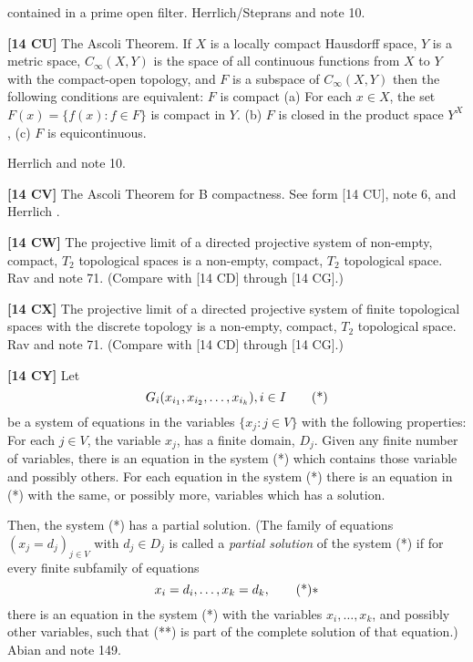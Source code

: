 contained in a prime open filter. \ac{Herrlich/Steprans} \cite{1997}
and note 10.
\smallskip
\item{}{\bf [14 CU]} The Ascoli Theorem. If $X$ is a locally compact
Hausdorff space, $Y$ is a metric space, $C_\infty(X,Y)$ is the space
of all continuous functions from $X$ to $Y$ with the compact-open
topology, and $F$ is a subspace of $C_\infty(X,Y)$ then the following
conditions are equivalent:
 $F$ is compact
 (a) For each $x\in X$, the set $F(x) =\{f(x): f\in F\}$
is compact in $Y$.
\itemitem{}(b) $F$ is closed in the product space $Y^X$,
\itemitem{}(c) $F$ is equicontinuous.
\par \ac{Herrlich} \cite{1997b} and note 10.
\smallskip
\item{}{\bf [14 CV]} The Ascoli Theorem for B compactness. See form
[14 CU], note 6, and \ac{Herrlich} \cite{1997b}.
\smallskip
\item{}{\bf [14 CW]} The projective limit of a directed projective system
of non-empty, compact, $T_2$ topological spaces is a non-empty, compact,
$T_2$ topological space.  \ac{Rav} \cite{1976} and note 71. (Compare
with [14 CD] through [14 CG].)
\smallskip
\item{}{\bf [14 CX]} The projective limit of a directed projective system
of finite topological spaces with the discrete topology is a non-empty,
compact, $T_2$ topological space.  \ac{Rav} \cite{1976} and note 71.
(Compare with [14 CD] through [14 CG].)
\smallskip
\item{}{\bf [14 CY]} Let
$$G_i(x_{i_1}, x_{i_2}, \ldots, x_{i_k}), i\in I\tag* $$
be a system of equations in the variables $\{x_j: j\in V\}$
with the following properties:
 For each $j\in V$, the variable $x_j$, has a finite domain,
$D_j$.
 Given any finite number of variables, there is an equation
in the system (*) which contains those variable and possibly others.
 For each equation in the system (*) there is an equation in
(*) with the same, or possibly more, variables which has a solution.
\smallskip
\item{}Then, the system (*) has a partial solution. (The family of equations
$(x_j=d_j)_{j\in V}$ with $d_j\in D_j$ is called a {\it partial
solution} of the system (*) if for every finite subfamily of equations
$$x_i = d_i, \ldots, x_k = d_k,\tag**$$ there is
an equation in the system (*) with the variables $x_i, \ldots, x_k$, and
possibly other variables, such that (**) is part of the complete
solution of that equation.) \ac{Abian} \cite{1973} and note 149.
